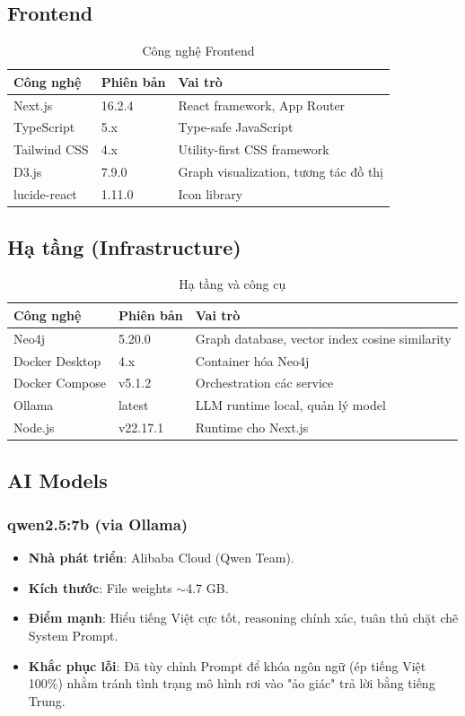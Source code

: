 \documentclass[12pt,a4paper]{article}
\begin{document}
\subsection{Frontend}
\begin{table}[H]
\centering
\caption{Công nghệ Frontend}
\begin{tabularx}{\textwidth}{llX}
\toprule
\textbf{Công nghệ} & \textbf{Phiên bản} & \textbf{Vai trò} \\
\midrule
Next.js & 16.2.4 & React framework, App Router \\
TypeScript & 5.x & Type-safe JavaScript \\
Tailwind CSS & 4.x & Utility-first CSS framework \\
D3.js & 7.9.0 & Graph visualization, tương tác đồ thị \\
lucide-react & 1.11.0 & Icon library \\
\bottomrule
\end{tabularx}
\end{table}

\subsection{Hạ tầng (Infrastructure)}
\begin{table}[H]
\centering
\caption{Hạ tầng và công cụ}
\begin{tabularx}{\textwidth}{llX}
\toprule
\textbf{Công nghệ} & \textbf{Phiên bản} & \textbf{Vai trò} \\
\midrule
Neo4j & 5.20.0 & Graph database, vector index cosine similarity \\
Docker Desktop & 4.x & Container hóa Neo4j \\
Docker Compose & v5.1.2 & Orchestration các service \\
Ollama & latest & LLM runtime local, quản lý model \\
Node.js & v22.17.1 & Runtime cho Next.js \\
\bottomrule
\end{tabularx}
\end{table}

\subsection{AI Models}
\subsubsection{qwen2.5:7b (via Ollama)}
\begin{itemize}
\item \textbf{Nhà phát triển}: Alibaba Cloud (Qwen Team).
\item \textbf{Kích thước}: File weights $\sim$4.7 GB.
\item \textbf{Điểm mạnh}: Hiểu tiếng Việt cực tốt, reasoning chính xác, tuân thủ chặt chẽ System Prompt.
\item \textbf{Khắc phục lỗi}: Đã tùy chỉnh Prompt để khóa ngôn ngữ (ép tiếng Việt 100\%) nhằm tránh tình trạng mô hình rơi vào "ảo giác" trả lời bằng tiếng Trung.
\end{itemize}
\end{document}

